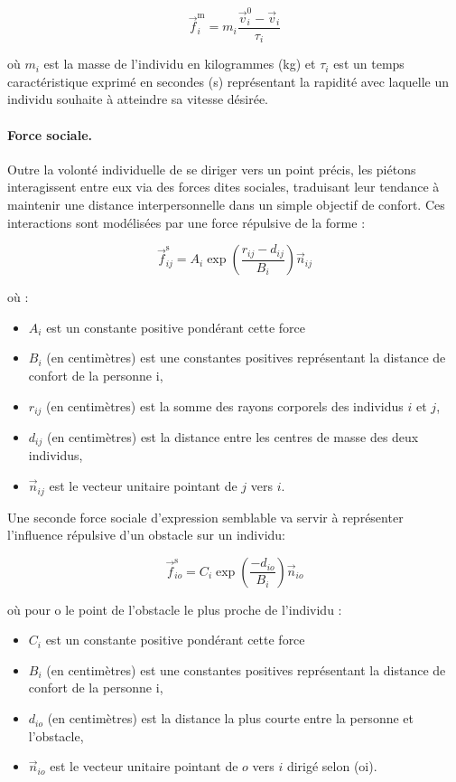\documentclass[a4paper,12pt]{article}
\begin{document}
\begin{equation}
\label{eq:force_motrice}
\vec{f}_i^{\text{m}} = m_i \frac{\vec{v}_i^0 - \vec{v}_i}{\tau_i}
\end{equation}

où $m_i$ est la masse de l'individu en kilogrammes (kg) et $\tau_i$ est un temps caractéristique exprimé en secondes (s) représentant la rapidité avec laquelle un individu souhaite à atteindre sa vitesse désirée.

\paragraph{Force sociale.}
Outre la volonté individuelle de se diriger vers un point précis, les piétons interagissent entre eux via des forces dites sociales, traduisant leur tendance à maintenir une distance interpersonnelle dans un simple objectif de confort. Ces interactions sont modélisées par une force répulsive de la forme :

\begin{equation}
\label{eq:force_sociale (individu-individu}
\vec{f}_{ij}^{\text{s}} = A_i \exp\left(\frac{r_{ij} - d_{ij}}{B_i}\right) \vec{n}_{ij}
\end{equation}

où :
\begin{itemize}
  \item $A_i$ est un constante positive pondérant cette force
  \item  $B_i$ (en centimètres) est une constantes positives représentant la distance de confort de la personne i,
  \item $r_{ij}$ (en centimètres) est la somme des rayons corporels des individus $i$ et $j$,
  \item $d_{ij}$ (en centimètres) est la distance entre les centres de masse des deux individus,
  \item $\vec{n}_{ij}$ est le vecteur unitaire pointant de $j$ vers $i$.
\end{itemize}

Une seconde force sociale d'expression semblable va servir à représenter l'influence répulsive d'un obstacle sur un individu:

\begin{equation}
\label{eq:force_sociale (obstacle-individu}
\vec{f}_{io}^{\text{s}} = C_i \exp\left(\frac{- d_{io}}{B_i}\right) \vec{n}_{io}
\end{equation}

où pour o le point de l'obstacle le plus proche de l'individu :
\begin{itemize}
  \item $C_i$ est un constante positive pondérant cette force
  \item  $B_i$ (en centimètres) est une constantes positives représentant la distance de confort de la personne i,
  \item $d_{io}$ (en centimètres) est la distance la plus courte entre la personne et l'obstacle,
  \item $\vec{n}_{io}$ est le vecteur unitaire pointant de $o$ vers $i$ dirigé selon (oi).
\end{itemize}
\end{document}
